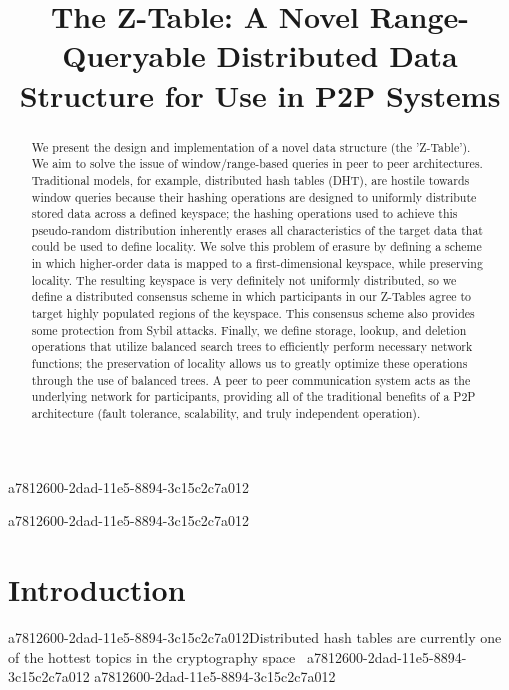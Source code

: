 \documentclass[12pt]{article}
\title{The Z-Table: A Novel Range-Queryable Distributed Data Structure for Use in P2P Systems}
\begin{document}
a7812600-2dad-11e5-8894-3c15c2c7a012
\maketitle

\begin{abstract}
We present the design and implementation of a novel data structure (the 'Z-Table'). We aim to solve the issue of window/range-based queries in peer to peer architectures. Traditional models, for example,  distributed hash tables (DHT), are hostile towards window queries because their hashing operations are designed to uniformly distribute stored data across a defined keyspace; the hashing operations used to achieve this pseudo-random distribution inherently erases all characteristics of the target data that could be used to define locality. We solve this problem of erasure by defining a scheme in which higher-order data is mapped to a first-dimensional keyspace, while preserving locality. The resulting keyspace is very definitely not uniformly distributed, so we define a distributed consensus scheme in which participants in our Z-Tables agree to target highly populated regions of the keyspace. This consensus scheme also provides some protection from Sybil attacks. Finally, we define storage, lookup, and deletion operations that utilize balanced search trees to efficiently perform necessary network functions; the preservation of locality allows us to greatly optimize these operations through the use of balanced trees. A peer to peer communication system acts as the underlying network for participants, providing all of the traditional benefits of a P2P architecture (fault tolerance, scalability, and truly independent operation).
\end{abstract}
a7812600-2dad-11e5-8894-3c15c2c7a012

\newpage
\section{Introduction}
a7812600-2dad-11e5-8894-3c15c2c7a012Distributed hash tables are currently one of the hottest topics in the cryptography space~\cite{Stoica:2001dj,Rowstron:2001ea,Ratnasamy:2001wn}
a7812600-2dad-11e5-8894-3c15c2c7a012
\printbibliography
a7812600-2dad-11e5-8894-3c15c2c7a012
\end{document}
